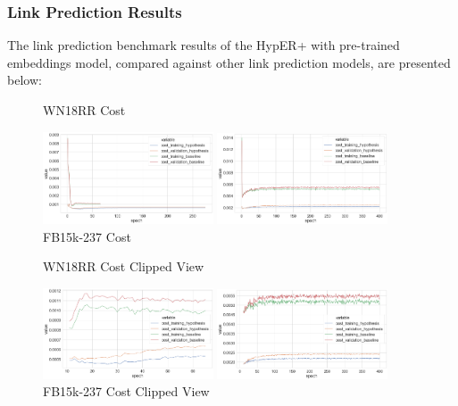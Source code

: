 \subsubsection{Link Prediction Results}
The link prediction benchmark results of the HypER+ with pre-trained embeddings model, compared against other link prediction models, are presented below:


\begin{figure}[H]
	\parbox{.5\linewidth}{
   		\caption{WN18RR Cost}
   		\centering
    		\includegraphics[width=0.45\textwidth, height=0.2\textheight]{WN18RR_Cost_Results}
		}
	\hfill
	\parbox{.5\linewidth}{
		\caption{FB15k-237 Cost}
   		\centering
		\includegraphics[width=0.45\textwidth, height=0.2\textheight]{FB15k-237_Cost_Results}
		}
\end{figure}

\begin{figure}[H]
	\parbox{.5\linewidth}{
   		\caption{WN18RR Cost Clipped View}
   		\centering
    		\includegraphics[width=0.45\textwidth, height=0.2\textheight]{WN18RR_Cost_Results_Clipped}
		}
	\hfill
	\parbox{.5\linewidth}{
		\caption{FB15k-237 Cost Clipped View}
   		\centering
		\includegraphics[width=0.45\textwidth, height=0.2\textheight]{FB15k-237_Cost_Results_Clipped}
		}
\end{figure}

